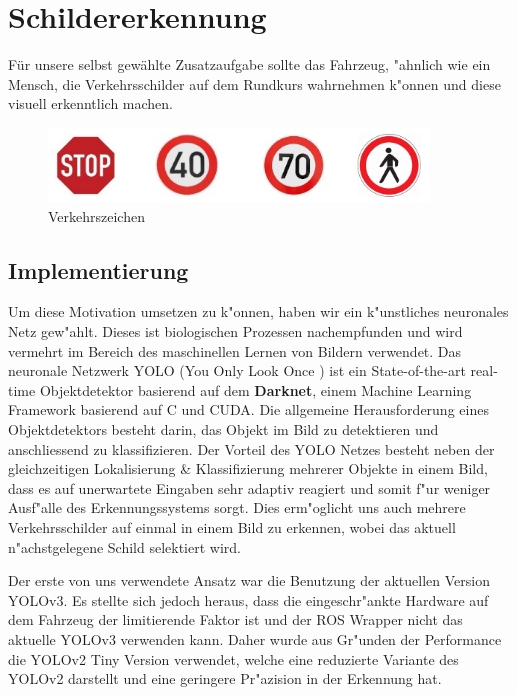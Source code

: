 \section{Schildererkennung}
\label{sec:schildererkennung}

F\"ur unsere selbst gew\"ahlte Zusatzaufgabe sollte das Fahrzeug, "ahnlich wie ein Mensch, die Verkehrsschilder auf dem Rundkurs wahrnehmen k"onnen und diese visuell erkenntlich machen.

\begin{figure}[h]
	\centering
	\includegraphics[width=0.9\textwidth]{images/Verkehrszeichen}
	\caption{Verkehrszeichen}
	\label{fig:verkehrszeichen}
\end{figure}

\subsection{Implementierung}
Um diese Motivation umsetzen zu k"onnen, haben wir ein k"unstliches neuronales Netz gew"ahlt. Dieses ist biologischen Prozessen nachempfunden und wird vermehrt im Bereich des maschinellen Lernen von Bildern verwendet. Das neuronale Netzwerk YOLO (You Only Look Once \cite{darknet13}) ist ein State-of-the-art real-time Objektdetektor
basierend auf dem \textbf{Darknet}, einem Machine Learning Framework basierend auf C und CUDA.
Die allgemeine Herausforderung eines Objektdetektors besteht darin, das Objekt im Bild zu detektieren und anschliessend zu klassifizieren. Der Vorteil des YOLO Netzes besteht neben der gleichzeitigen Lokalisierung \& Klassifizierung mehrerer Objekte in einem Bild, dass es auf unerwartete Eingaben sehr adaptiv reagiert und somit f"ur weniger Ausf"alle des Erkennungssystems sorgt. Dies erm"oglicht uns auch mehrere Verkehrsschilder auf einmal in einem Bild zu erkennen, wobei das aktuell n"achstgelegene Schild selektiert wird.

Der erste von uns verwendete Ansatz war die Benutzung der aktuellen Version YOLOv3. Es stellte sich jedoch heraus, dass die eingeschr"ankte Hardware auf dem Fahrzeug der limitierende Faktor ist und der ROS Wrapper nicht das aktuelle YOLOv3 verwenden kann. Daher wurde aus Gr"unden der Performance die YOLOv2 Tiny Version verwendet, welche eine reduzierte Variante des YOLOv2 darstellt und eine geringere Pr"azision in der Erkennung hat.

